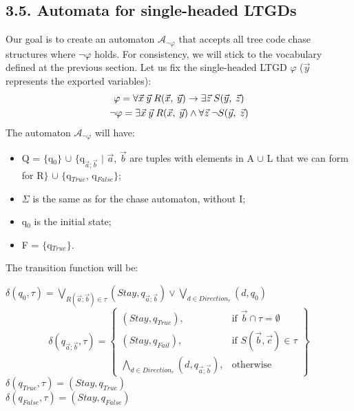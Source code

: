 \documentclass[11pt, a4paper, dvipsnames]{article}
\begin{document}
\subsection{3.5. Automata for single-headed LTGDs}
Our goal is to create an automaton $\mathcal{A}_{\neg \varphi}$ that accepts all tree code chase structures where $\neg \varphi$ holds. For consistency, we will stick to the vocabulary defined at the previous section. \newline
Let us fix the single-headed LTGD $\varphi$ ($\vec{y}$ represents the exported variables):
\begin{gather*}
\varphi = \forall \vec{x} \hspace{0.25em}\vec{y} \hspace{0.25em}R(\vec{x}, \hspace{0.25em} \vec{y}) \rightarrow \exists \vec{z} \hspace{0.25em}S(\vec{y}, \hspace{0.25em}\vec{z})\\
\neg \varphi = \exists \vec{x} \hspace{0.25em} \vec{y} \hspace{0.25em} R(\vec{x}, \hspace{0.25em} \vec{y}) \wedge \forall \vec{z} \hspace{0.25em} \neg S(\vec{y}, \hspace{0.25em}\vec{z})
\end{gather*}
The automaton $\mathcal{A}_{\neg \varphi}$ will have:
\begin{itemize}
	\item Q = $\{$q$_{0}\}$ $\cup$ $\{$q$_{\vec{a};\vec{b}}$ $|$ $\vec{a}$, $\vec{b}$ are tuples with elements in A $\cup$ L that we can form for R$\}$ $\cup$ $\{$q$_{True}$, q$_{False}\}$;
	\item $\Sigma$ is the same as for the chase automaton, without I;
	\item q$_{0}$ is the initial state;
	\item F = $\{$q$_{True}\}$.
\end{itemize}
The transition function will be:
\begin{center}
$\delta(q_{0}, \tau) = \bigvee\limits_{R(\vec{a};\vec{b}) \in \tau} (Stay, q_{\vec{a};\vec{b}}) \vee \bigvee\limits_{d \in Direction_{r}} (d, q_{0})$
\[\delta(q_{\vec{a}; \vec{b}}, \tau) = \left\{\begin{array}{lr}
        (Stay, q_{True}), & \text{if }\vec{b} \cap \tau = \emptyset \\
        (Stay, q_{Fail}), & \text{if } S(\vec{b}, \vec{c}) \in \tau \\
        \bigwedge\limits_{d \in Direction_{r}} (d, q_{\vec{a}; \vec{b}}), & \text{otherwise}
        \end{array}\right\}
  \] 
$\delta(q_{True}, \tau) = (Stay, q_{True})$\\
$\delta(q_{False}, \tau) = (Stay, q_{False})$
\end{center}
\end{document}
